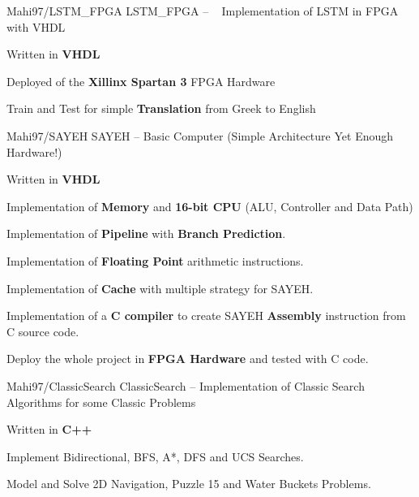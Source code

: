 \begin{cventries}
    
    \cventry
    {Mahi97/LSTM\_FPGA} %
    {LSTM\_FPGA -- ~ Implementation of LSTM in FPGA with VHDL} %
    {} %
    {} %
    {
      \begin{cvitems} %
        \item {Written in \textbf{VHDL}}
        \item {Deployed of the \textbf{Xillinx Spartan 3} FPGA Hardware}
        \item {Train and Test for simple \textbf{Translation} from Greek to English}
      \end{cvitems}
    }

    \cventry
    {Mahi97/SAYEH} %
    {SAYEH -- Basic Computer (Simple Architecture Yet Enough Hardware!)} %
    {} %
    {} %
    {
      \begin{cvitems} %
        \item {Written in \textbf{VHDL}}
        \item {Implementation of \textbf{Memory} and \textbf{16-bit CPU} (ALU, Controller and Data Path)}
        \item {Implementation of \textbf{Pipeline} with \textbf{Branch Prediction}.}
        \item {Implementation of \textbf{Floating Point} arithmetic instructions.}
        \item {Implementation of \textbf{Cache} with multiple strategy for SAYEH.}
        \item {Implementation of a \textbf{C compiler} to create SAYEH \textbf{Assembly} instruction from C source code.}
        \item {Deploy the whole project in \textbf{FPGA Hardware} and tested with C code.}
      \end{cvitems}
    }
    
    \cventry
    {Mahi97/ClassicSearch} %
    {ClassicSearch -- Implementation of Classic Search Algorithms for some Classic Problems} %
    {} %
    {} %
    {
      \begin{cvitems} %
        \item {Written in \textbf{C++}}
        \item {Implement Bidirectional, BFS, A*, DFS and UCS Searches.}
        \item {Model and Solve 2D Navigation, Puzzle 15 and Water Buckets Problems.}
      \end{cvitems}
    }
    

\end{cventries}
